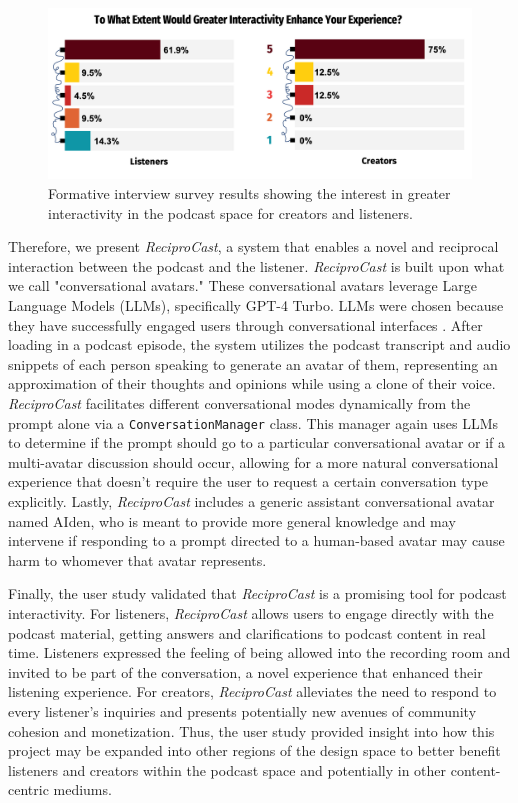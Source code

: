 \documentclass[12pt]{report}
\begin{document}
\begin{myfont}
\begin{figure}[H]
        \centering
          \includegraphics[width=1\textwidth]{figures/formative1.png}
          \caption{Formative interview survey results showing the interest in greater interactivity in the podcast space for creators and listeners.}
          \label{fig:formative1}
        \end{figure}
        \indent Therefore, we present \textit{ReciproCast}, a system that enables a novel and reciprocal interaction between the podcast and the listener. \textit{ReciproCast} is built upon what we call "conversational avatars." These conversational avatars leverage Large Language Models (LLMs), specifically GPT-4 Turbo. LLMs were chosen because they have successfully engaged users through conversational interfaces \citep{OpenAI2023GPT4}. After loading in a podcast episode, the system utilizes the podcast transcript and audio snippets of each person speaking to generate an avatar of them, representing an approximation of their thoughts and opinions while using a clone of their voice. \textit{ReciproCast} facilitates different conversational modes dynamically from the prompt alone via a \texttt{ConversationManager} class. This manager again uses LLMs to determine if the prompt should go to a particular conversational avatar or if a multi-avatar discussion should occur, allowing for a more natural conversational experience that doesn’t require the user to request a certain conversation type explicitly. Lastly, \textit{ReciproCast} includes a generic assistant conversational avatar named AIden, who is meant to provide more general knowledge and may intervene if responding to a prompt directed to a human-based avatar may cause harm to whomever that avatar represents.
        
        \indent Finally, the user study validated that \textit{ReciproCast} is a promising tool for podcast interactivity. For listeners, \textit{ReciproCast} allows users to engage directly with the podcast material, getting answers and clarifications to podcast content in real time. Listeners expressed the feeling of being allowed into the recording room and invited to be part of the conversation, a novel experience that enhanced their listening experience. For creators, \textit{ReciproCast} alleviates the need to respond to every listener's inquiries and presents potentially new avenues of community cohesion and monetization. Thus, the user study provided insight into how this project may be expanded into other regions of the design space to better benefit listeners and creators within the podcast space and potentially in other content-centric mediums.
        

\end{myfont}
\end{document}
